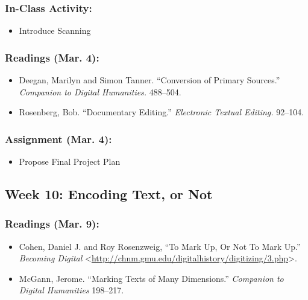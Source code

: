 \documentclass[]{article}
\begin{document}
\subsubsection{In-Class Activity:}\label{in-class-activity}

\begin{itemize}
\itemsep1pt\parskip0pt
\item
  Introduce Scanning
\end{itemize}

\subsubsection{Readings (Mar. 4):}\label{readings-mar.-4}

\begin{itemize}
\itemsep1pt\parskip0pt
\item
  Deegan, Marilyn and Simon Tanner. ``Conversion of Primary Sources.''
  \emph{Companion to Digital Humanities.} 488--504.
\item
  Rosenberg, Bob. ``Documentary Editing.'' \emph{Electronic Textual
  Editing.} 92--104.
\end{itemize}

\subsubsection{Assignment (Mar. 4):}\label{assignment-mar.-4}

\begin{itemize}
\itemsep1pt\parskip0pt
\item
  Propose Final Project Plan
\end{itemize}

\subsection{Week 10: Encoding Text, or
Not}\label{week-10-encoding-text-or-not}

\subsubsection{Readings (Mar. 9):}\label{readings-mar.-9}

\begin{itemize}
\itemsep1pt\parskip0pt
\item
  Cohen, Daniel J. and Roy Rosenzweig, ``To Mark Up, Or Not To Mark
  Up.'' \emph{Becoming Digital}
  \textless{}\url{http://chnm.gmu.edu/digitalhistory/digitizing/3.php}\textgreater{}.
\item
  McGann, Jerome. ``Marking Texts of Many Dimensions.'' \emph{Companion
  to Digital Humanities} 198--217.
\end{itemize}
\end{document}
